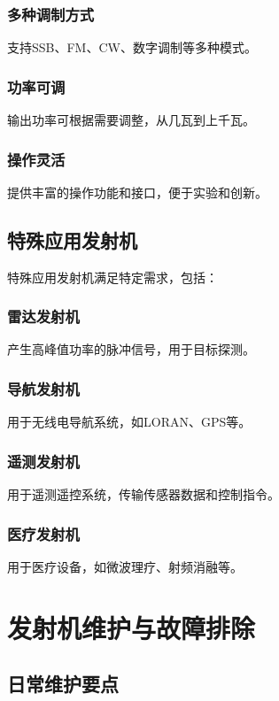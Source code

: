 \documentclass[12pt,UTF8]{ctexbook}
\begin{document}
\subsubsection{多种调制方式}
支持SSB、FM、CW、数字调制等多种模式。

\subsubsection{功率可调}
输出功率可根据需要调整，从几瓦到上千瓦。

\subsubsection{操作灵活}
提供丰富的操作功能和接口，便于实验和创新。

\subsection{特殊应用发射机}

特殊应用发射机满足特定需求，包括：

\subsubsection{雷达发射机}
产生高峰值功率的脉冲信号，用于目标探测。

\subsubsection{导航发射机}
用于无线电导航系统，如LORAN、GPS等。

\subsubsection{遥测发射机}
用于遥测遥控系统，传输传感器数据和控制指令。

\subsubsection{医疗发射机}
用于医疗设备，如微波理疗、射频消融等。

\section{发射机维护与故障排除}

\subsection{日常维护要点}
\end{document}
